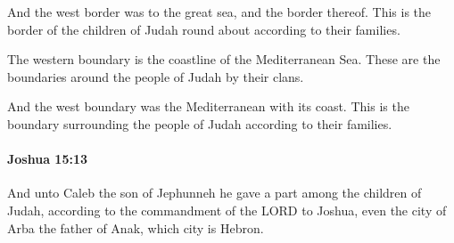 			\begin{versebox}
					\item[BHS] 
					\item[ASV] And the west border was to the great sea, and the border thereof. This is the border of the children of Judah round about according to their families.
					\item[NIV] The western boundary is the coastline of the Mediterranean Sea. These are the boundaries around the people of Judah by their clans.
					\item[NRSV] And the west boundary was the Mediterranean with its coast. This is the boundary surrounding the people of Judah according to their families.
			\end{versebox}

		\paragraph{Joshua 15:13} %
			\label{JOSHUA-15-13}

			And unto Caleb the son of Jephunneh he gave a part among the children of Judah, according to the commandment of the LORD to Joshua, even the city of Arba the father of Anak, which city is Hebron.


